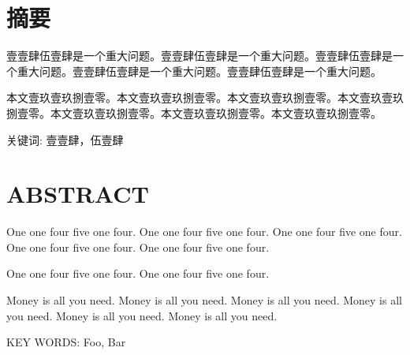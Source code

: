 \chapter*{\bfseries 摘要}

壹壹肆伍壹肆是一个重大问题。壹壹肆伍壹肆是一个重大问题。壹壹肆伍壹肆是一个重大问题。壹壹肆伍壹肆是一个重大问题。壹壹肆伍壹肆是一个重大问题。

本文壹玖壹玖捌壹零。本文壹玖壹玖捌壹零。本文壹玖壹玖捌壹零。本文壹玖壹玖捌壹零。本文壹玖壹玖捌壹零。本文壹玖壹玖捌壹零。本文壹玖壹玖捌壹零。

\bigskip
\bigskip

关键词: 壹壹肆，伍壹肆

\chapter*{\bfseries ABSTRACT}

{\parindent0pt

One one four five one four. One one four five one four. One one four five one four. One one four five one four. One one four five one four.

One one four five one four. One one four five one four.

Money is all you need. Money is all you need. Money is all you need. Money is all you need. Money is all you need. Money is all you need.

\bigskip
\bigskip

KEY WORDS: Foo, Bar
}